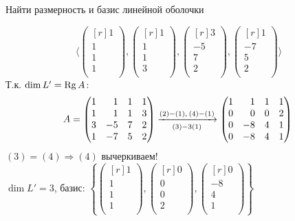 \begin{prim}
	Найти размерность и базис линейной оболочки
\end{prim}
$$
\langle 
\begin{pmatrix*}[r]
1\\ 
1\\ 
1\\ 
1\\
\end{pmatrix*}
,
\begin{pmatrix*}[r]
1\\ 
1\\ 
1\\ 
3\\
\end{pmatrix*}
,
\begin{pmatrix*}[r]
3\\ 
-5\\ 
7\\ 
2\\
\end{pmatrix*}
,
\begin{pmatrix*}[r]
1\\ 
-7\\ 
5\\ 
2\\
\end{pmatrix*}
\rangle 
$$
Т.к. $\dim L'=\operatorname{\mathop{Rg}} A$:
$$
A=
\begin{pmatrix*}[r]
1 & 1 & 1 & 1 \\
1 & 1 & 1 & 3 \\
3 & -5 & 7 & 2 \\
1 & -7 & 5 & 2 \\ 
\end{pmatrix*} 
\xrightarrow[(3)-3(1)]{ %
	(2)-(1),\\
	(4)-(1)}
\begin{pmatrix*}[r]
1 & 1 & 1 & 1 \\
0 & 0 & 0 & 2 \\
0 & -8 & 4 & 1 \\
0 & -8 & 4 & 1 \\ 
\end{pmatrix*} \\
$$
$(3)=(4) \Rightarrow (4)$ вычеркиваем!\\
$\dim  L'=3$, базис: $
\left\{
\begin{pmatrix*}[r]
1\\ 
1\\ 
1\\ 
1\\
\end{pmatrix*}
,
\begin{pmatrix*}[r]
0\\ 
0\\ 
0\\ 
2\\
\end{pmatrix*}
,
\begin{pmatrix*}[r]
0\\ 
-8\\ 
4\\ 
1\\
\end{pmatrix*}
\right\}$

